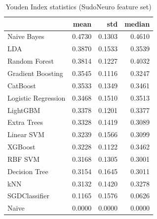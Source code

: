 \begin{table}
\caption{Youden Index statistics (SudoNeuro feature set)}
\label{tab:youden_SudoNeuro_stats}
\begin{tabular}{lrrr}
\toprule
 & mean & std & median \\
\midrule
Naive Bayes & 0.4730 & 0.1303 & 0.4610 \\
LDA & 0.3870 & 0.1533 & 0.3539 \\
Random Forest & 0.3814 & 0.1227 & 0.4032 \\
Gradient Boosting & 0.3545 & 0.1116 & 0.3247 \\
CatBoost & 0.3533 & 0.1349 & 0.3461 \\
Logistic Regression & 0.3468 & 0.1510 & 0.3513 \\
LightGBM & 0.3378 & 0.1201 & 0.3377 \\
Extra Trees & 0.3328 & 0.1419 & 0.3089 \\
Linear SVM & 0.3239 & 0.1566 & 0.3099 \\
XGBoost & 0.3228 & 0.1122 & 0.3462 \\
RBF SVM & 0.3168 & 0.1305 & 0.3001 \\
Decision Tree & 0.3154 & 0.1645 & 0.3011 \\
kNN & 0.3132 & 0.1420 & 0.3278 \\
SGDClassifier & 0.1165 & 0.1576 & 0.0626 \\
Naive & 0.0000 & 0.0000 & 0.0000 \\
\bottomrule
\end{tabular}
\end{table}
